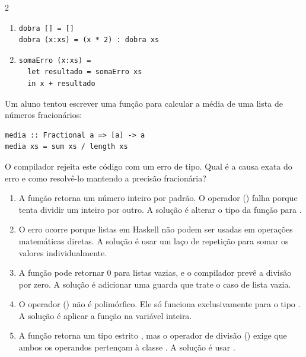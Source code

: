 \documentclass[a4paper,10pt,brazil]{article}
\begin{document}
\begin{multicols}{2}
\begin{enumerate}
  \item \begin{verbatim}
dobra [] = []
dobra (x:xs) = (x * 2) : dobra xs
\end{verbatim}

  \item \begin{verbatim}
somaErro (x:xs) = 
  let resultado = somaErro xs 
  in x + resultado
\end{verbatim}


\end{enumerate}

Um aluno tentou escrever uma função para calcular a média de uma lista de números fracionários:
\begin{verbatim}
media :: Fractional a => [a] -> a
media xs = sum xs / length xs
\end{verbatim}
O compilador rejeita este código com um erro de tipo. Qual é a causa exata do erro e como resolvê-lo mantendo a precisão fracionária?

\begin{enumerate}
  \item A função  retorna um número inteiro por padrão. O operador (\haskellinline{/}) falha porque tenta dividir um inteiro por outro. A solução é alterar o tipo da função para .

  \item O erro ocorre porque listas em Haskell não podem ser usadas em operações matemáticas diretas. A solução é usar um laço de repetição  para somar os valores individualmente.

  \item A função  pode retornar 0 para listas vazias, e o compilador prevê a divisão por zero. A solução é adicionar uma guarda que trate o caso de lista vazia.

  \item O operador (\haskellinline{/}) não é polimórfico. Ele só funciona exclusivamente para o tipo . A solução é aplicar a função  na variável  inteira.

  \item A função  retorna um tipo estrito , mas o operador de divisão (\haskellinline{/}) exige que ambos os operandos pertençam à classe . A solução é usar .



\end{enumerate}
\end{multicols}
\end{document}
